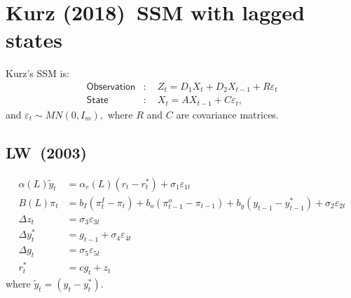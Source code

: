 \documentclass[a4paper,12pt]{article}
\newcommand{\bsq}{\begin{subequations}}\newcommand{\esq}{\end{subequations}}
\begin{document}

\section{Kurz (2018)\ SSM with lagged states}

Kurz's SSM is:\bsq\label{SSM}%
\begin{align}
\mathsf{Observation}& :\quad Z_{t}=D_{1}X_{t}+D_{2}X_{t-1}+R\varepsilon _{t}
\label{ssm1} \\
\mathsf{State}& :\quad X_{t}=AX_{t-1}+C\varepsilon _{t},  \label{ssm2}
\end{align}%
\esq and $\varepsilon _{t}\sim MN(0,I_{m}),$ where $R$ and $C$ are
covariance matrices.

\subsection{LW\ (2003)}

\begin{align}
\alpha (L)\tilde{y}_{t}& =\alpha _{r}(L)(r_{t}-r_{t}^{\ast })+\sigma
_{1}\varepsilon _{1t}  \label{lw1} \\
B(L)\pi _{t}& =b_{I}(\pi _{t}^{I}-\pi _{t})+b_{o}(\pi _{t-1}^{o}-\pi
_{t-1})+b_{y}(y_{t-1}-y_{t-1}^{\ast })+\sigma _{2}\varepsilon _{2t}
\label{lw2} \\
\Delta z_{t}& =\sigma _{3}\varepsilon _{3t}  \label{lw3} \\
\Delta y_{t}^{\ast }& =g_{t-1}+\sigma _{4}\varepsilon _{4t}  \label{lw4} \\
\Delta g_{t}& =\sigma _{5}\varepsilon _{5t}  \label{lw5} \\
r_{t}^{\ast }& =cg_{t}+z_{t}  \label{lw6}
\end{align}%
where $\tilde{y}_{t}=(y_{t}-y_{t}^{\ast })$.
\end{document}
